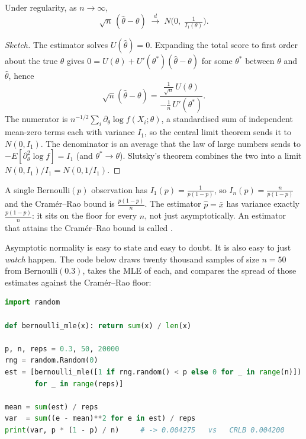 \documentclass[11pt]{article}
\begin{document}
\begin{theorem}
Under regularity, as $n\to\infty$,
\[
  \sqrt{n}\,(\hat\theta-\theta) \;\xrightarrow{\;d\;}\; N\!\Big(0,\;\tfrac{1}{I_1(\theta)}\Big).
\]
\end{theorem}
\begin{proof}[Sketch]
The estimator solves $U(\hat\theta)=0$. Expanding the total score to first
order about the true $\theta$ gives
$0 = U(\theta) + U'(\theta^\ast)(\hat\theta-\theta)$ for some $\theta^\ast$
between $\theta$ and $\hat\theta$, hence
\[
  \sqrt{n}(\hat\theta-\theta)
   = \frac{\tfrac{1}{\sqrt n}\,U(\theta)}{-\tfrac{1}{n}\,U'(\theta^\ast)} .
\]
The numerator is $n^{-1/2}\sum_i \partial_\theta\log f(X_i;\theta)$, a
standardised sum of independent mean-zero terms each with variance $I_1$,
so the central limit theorem sends it to $N(0,I_1)$. The denominator is an
average that the law of large numbers sends to
$-E[\partial_\theta^2\log f]=I_1$ (and $\theta^\ast\to\theta$). Slutsky's
theorem combines the two into a limit $N(0,I_1)/I_1 = N(0,1/I_1)$.
\end{proof}

\begin{example}
A single $\mathrm{Bernoulli}(p)$ observation has
$I_1(p)=\frac{1}{p(1-p)}$, so $I_n(p)=\frac{n}{p(1-p)}$ and the
Cram\'er--Rao bound is $\frac{p(1-p)}{n}$. The estimator $\hat p=\bar x$ has
variance exactly $\frac{p(1-p)}{n}$: it sits on the floor for every $n$, not
just asymptotically. An estimator that attains the Cram\'er--Rao bound is
called .
\end{example}

Asymptotic normality is easy to state and easy to doubt. It is also easy to
just \emph{watch} happen. The code below draws twenty thousand samples of
size $n=50$ from $\mathrm{Bernoulli}(0.3)$, takes the MLE of each, and
compares the spread of those estimates against the Cram\'er--Rao floor:

\begin{lstlisting}[language=Python]
import random

def bernoulli_mle(x): return sum(x) / len(x)

p, n, reps = 0.3, 50, 20000
rng = random.Random(0)
est = [bernoulli_mle([1 if rng.random() < p else 0 for _ in range(n)])
       for _ in range(reps)]

mean = sum(est) / reps
var  = sum((e - mean)**2 for e in est) / reps
print(var, p * (1 - p) / n)     # -> 0.004275   vs   CRLB 0.004200
\end{lstlisting}
\end{document}
